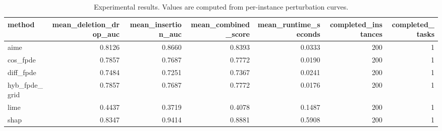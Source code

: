 \begin{table}[t]
\caption{Experimental results. Values are computed from per-instance perturbation curves.}
\label{tab:main_results_computed}
\centering
\begin{tabular}{lrrrrrr}
\toprule
method & mean\_deletion\_drop\_auc & mean\_insertion\_auc & mean\_combined\_score & mean\_runtime\_seconds & completed\_instances & completed\_tasks \\
\midrule
aime & 0.8126 & 0.8660 & 0.8393 & 0.0333 & 200 & 1 \\
cos\_fpde & 0.7857 & 0.7687 & 0.7772 & 0.0190 & 200 & 1 \\
diff\_fpde & 0.7484 & 0.7251 & 0.7367 & 0.0241 & 200 & 1 \\
hyb\_fpde\_grid & 0.7857 & 0.7687 & 0.7772 & 0.0176 & 200 & 1 \\
lime & 0.4437 & 0.3719 & 0.4078 & 0.1487 & 200 & 1 \\
shap & 0.8347 & 0.9414 & 0.8881 & 0.5908 & 200 & 1 \\
\bottomrule
\end{tabular}

\end{table}

